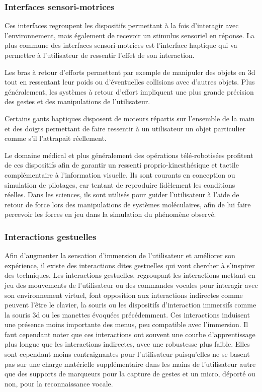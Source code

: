 \subsubsection{Interfaces sensori-motrices} \label{interface_sensor-motor}

 Ces interfaces regroupent les dispositifs permettant à la fois d'interagir avec l'environnement, mais également de recevoir un stimulus sensoriel en réponse. La plus commune des interfaces sensori-motrices est l'interface haptique qui va permettre à l'utilisateur de ressentir l'effet de son interaction. 

Les bras à retour d'efforts permettent par exemple de manipuler des objets en 3d tout en ressentant leur poids ou d'éventuelles collisions avec d'autres objets. Plus généralement, les systèmes à retour d'effort impliquent une plus grande précision des gestes et des manipulations de l'utilisateur.

Certains gants haptiques disposent de moteurs répartis sur l'ensemble de la main et des doigts permettant de faire ressentir à un utilisateur un objet particulier comme s'il l'attrapait réellement.

Le domaine médical et plus généralement des opérations télé-robotisées profitent de ces dispositifs afin de garantir un ressenti proprio-kinesthésique et tactile complémentaire à l'information visuelle. Ils sont courants en conception ou simulation de pilotages, car tentant de reproduire fidèlement les conditions réelles.
Dans les sciences, ils sont utilisés pour guider l'utilisateur à l'aide de retour de force lors des manipulations de systèmes moléculaires, afin de lui faire percevoir les forces en jeu dans la simulation du phénomène observé.

\subsubsection{Interactions gestuelles} \label{interface_nature}

Afin d'augmenter la sensation d'immersion de l'utilisateur et améliorer son expérience, il existe des interactions dites gestuelles qui vont chercher à s'inspirer des techniques.
Les interactions gestuelles, regroupant les interactions mettant en jeu des mouvements de l'utilisateur ou des commandes vocales pour interagir avec son environnement virtuel, font opposition aux interactions indirectes comme peuvent l'être le clavier, la souris ou les dispositifs d'interaction immersifs comme la souris 3d ou les manettes évoquées précédemment. Ces interactions induisent une présence moins importante des menus, peu compatible avec l'immersion. Il faut cependant noter que ces interactions ont souvent une courbe d'apprentissage plus longue que les interactions indirectes, avec une robustesse plus faible. Elles sont cependant moins contraignantes pour l'utilisateur puisqu'elles ne se basent pas sur une charge matérielle supplémentaire dans les mains de l'utilisateur autre que des supports de marqueurs pour la capture de gestes et un micro, déporté ou non, pour la reconnaissance vocale. 

